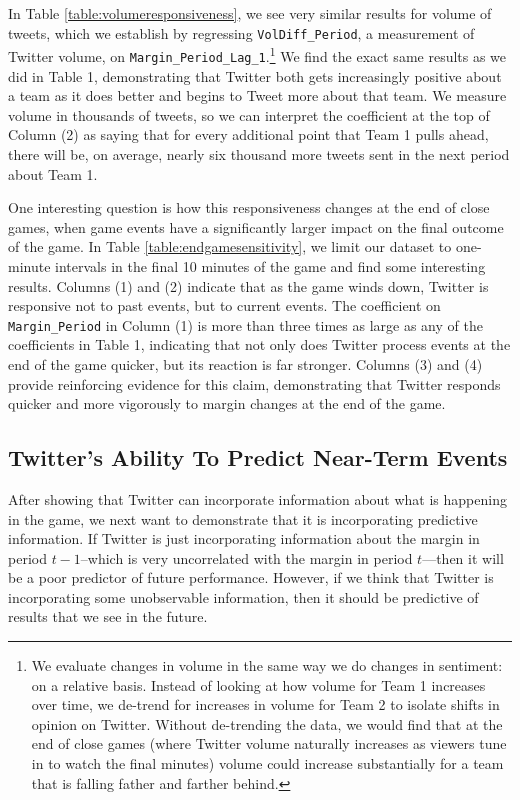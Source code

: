 \documentclass[12pt]{article}
\begin{document}
\begin{doublespacing}
In Table \ref{table:volumeresponsiveness}, we see very similar results for volume of tweets,
which we establish by regressing \texttt{VolDiff\_Period}, a measurement of Twitter volume, on \texttt{Margin\_Period\_Lag\_1}.\footnote{We evaluate changes in volume in the same way we do changes in sentiment: on a relative basis. Instead of looking at how volume for Team 1 increases over time, we de-trend for increases in volume for Team 2 to isolate shifts in opinion on Twitter. Without de-trending the data, we would find that at the end of close games (where Twitter volume naturally increases as viewers tune in to watch the final minutes) volume could increase substantially for a team that is falling father and farther behind.} We find the exact same results as we did in Table 1, demonstrating that Twitter both gets increasingly positive about a team as it does better and begins to Tweet more about that team. We measure volume in thousands of tweets, so we can interpret the coefficient at the top of Column (2) as saying that for every additional point that Team 1 pulls ahead, there will be, on average, nearly six thousand more tweets sent in the next period about Team 1. 

One interesting question is how this responsiveness changes at the end of close games, when game events have a significantly larger impact on the final outcome of the game. In Table \ref{table:endgamesensitivity}, we limit our dataset to one-minute intervals in the final 10 minutes of the game and find some interesting results. Columns (1) and (2) indicate that as the game winds down, Twitter is responsive not to past events, but to current events. The coefficient on \texttt{Margin\_Period} in Column (1) is more than three times as large as any of the coefficients in Table 1, indicating that not only does Twitter process events at the end of the game quicker, but its reaction is far stronger. Columns (3) and (4) provide reinforcing evidence for this claim, demonstrating that Twitter responds quicker and more vigorously to margin changes at the end of the game. 

\subsection{Twitter's Ability To Predict Near-Term Events}

After showing that Twitter can incorporate information about what is happening in the game, we next want to demonstrate that it is incorporating predictive information. If Twitter is just incorporating information about the margin in period $t-1$--which is very uncorrelated with the margin in period $t$---then it will be a poor predictor of future performance. However, if we think that Twitter is incorporating some unobservable information, then it should be predictive of results that we see in the future. 


\end{doublespacing}
\end{document}
